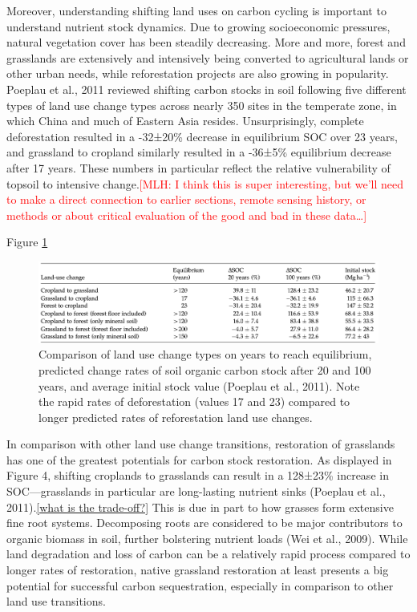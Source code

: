 \documentclass{book}\usepackage{knitr}
\newcommand{\red}[1]{\textcolor{red}{[MLH: #1]}}
\begin{document}
\begin{knitrout}
\begin{kframe}
Moreover, understanding shifting land uses on carbon cycling is important to understand nutrient stock dynamics. Due to growing socioeconomic pressures, natural vegetation cover has been steadily decreasing. More and more, forest and grasslands are extensively and intensively being converted to agricultural lands or other urban needs, while reforestation projects are also growing in popularity. Poeplau et al., 2011 reviewed shifting carbon stocks in soil following five different types of land use change types across nearly 350 sites in the temperate zone, in which China and much of Eastern Asia resides. Unsurprisingly, complete deforestation resulted in a -32±20\% decrease in equilibrium SOC over 23 years, and grassland to cropland similarly resulted in a -36±5\% equilibrium decrease after 17 years. These numbers in particular reflect the relative vulnerability of topsoil to intensive change.\red{I think this is super interesting, but we'll need to make a direct connection to earlier sections, remote sensing history, or methods or about critical evaluation of the good and bad in these data\ldots}

Figure \ref{fig:LUC-SOC-Table}

\begin{figure}
\includegraphics[width=\linewidth]{images/land-use/LUC-SOC-Table.png}
\caption{Comparison of land use change types on years to reach equilibrium, predicted change rates of soil organic carbon stock after 20 and 100 years, and average initial stock value (Poeplau et al., 2011). Note the rapid rates of deforestation (values 17 and 23) compared to longer predicted rates of reforestation land use changes.}
\label{fig:LUC-SOC-Table}
\end{figure}

In comparison with other land use change transitions, restoration of grasslands has one of the greatest potentials for carbon stock restoration. As displayed in Figure 4, shifting croplands to grasslands can result in a 128±23\% increase in SOC—grasslands in particular are long-lasting nutrient sinks (Poeplau et al., 2011).\ref{what is the trade-off?} This is due in part to how grasses form extensive fine root systems. Decomposing roots are considered to be major contributors to organic biomass in soil, further bolstering nutrient loads (Wei et al., 2009). While land degradation and loss of carbon can be a relatively rapid process compared to longer rates of restoration, native grassland restoration at least presents a big potential for successful carbon sequestration, especially in comparison to other land use transitions.


\end{kframe}
\end{knitrout}
\end{document}
